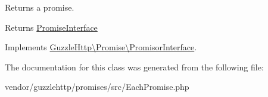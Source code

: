 Returns a promise.

\begin{DoxyReturn}{Returns}
\hyperlink{interfaceGuzzleHttp_1_1Promise_1_1PromiseInterface}{Promise\+Interface} 
\end{DoxyReturn}


Implements \hyperlink{interfaceGuzzleHttp_1_1Promise_1_1PromisorInterface_a228085a17057d886d5486c7c433be879}{Guzzle\+Http\textbackslash{}\+Promise\textbackslash{}\+Promisor\+Interface}.



The documentation for this class was generated from the following file\+:\begin{DoxyCompactItemize}
\item 
vendor/guzzlehttp/promises/src/Each\+Promise.\+php\end{DoxyCompactItemize}

